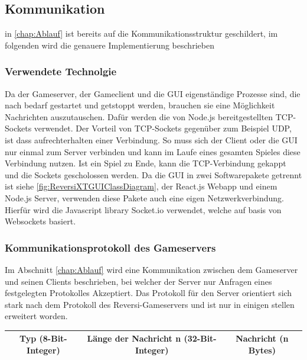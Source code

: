 \documentclass[12pt,a4paper,bibliography=totocnumbered,listof=totocnumbered]{article}
\begin{document}

\subsection{Kommunikation}
in \ref{chap:Ablauf} ist bereits auf die Kommunikationsstruktur geschildert, im folgenden wird die genauere Implementierung beschrieben

\subsubsection{Verwendete Technolgie}
Da der Gameserver, der Gameclient und die GUI eigenständige Prozesse sind, die nach bedarf gestartet und getstoppt werden, brauchen sie eine 
Möglichkeit Nachrichten auszutauschen. Dafür werden die von Node.js bereitgestellten TCP-Sockets verwendet. Der Vorteil von TCP-Sockets 
gegenüber zum Beispiel UDP, ist dass aufrechterhalten einer Verbindung. So muss sich der Client oder die GUI nur einmal zum Server verbinden 
und kann im Laufe eines gesamten Spieles diese Verbindung nutzen. Ist ein Spiel zu Ende, kann die TCP-Verbindung gekappt und die 
Sockets gescholossen werden. Da die GUI in zwei Softwarepakete getrennt ist siehe \ref{fig:ReversiXTGUIClassDiagram}, der React.js Webapp und einem Node.js Server, verwenden 
diese Pakete auch eine eigen Netzwerkverbindung. Hierfür wird die Javascript library Socket.io verwendet, welche auf basis von Websockets basiert.

\subsubsection{Kommunikationsprotokoll des Gameservers}
Im Abschnitt \ref{chap:Ablauf} wird eine Kommunikation zwischen dem Gameserver und seinen Clients beschrieben, bei welcher der 
Server nur Anfragen eines festgelegten Protokolles Akzeptiert. Das Protokoll für den Server orientiert sich stark nach dem Protokoll
des Reversi-Gameservers und ist nur in einigen stellen erweitert worden.
%
\begin{table}[H]
    \centering
    \begin{tabular} {|c|c|c|}
        \hline
        Typ (8-Bit-Integer) & Länge der Nachricht n (32-Bit-Integer) & Nachricht (n Bytes) \\
        \hline
    \end{tabular}
    \label{fig:Nachritenaufbau}
\end{table}
\end{document}
